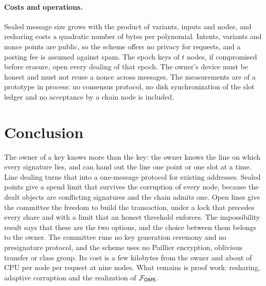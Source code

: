 \paragraph{Costs and operations.} Sealed message size grows with the product of variants, inputs and nodes, and resharing costs a quadratic number of bytes per polynomial. Intents, variants and nonce points are public, so the scheme offers no privacy for requests, and a posting fee is assumed against spam. The epoch keys of $t$ nodes, if compromised before erasure, open every dealing of that epoch. The owner's device must be honest and must not reuse a nonce across messages. The measurements are of a prototype in process: no consensus protocol, no disk synchronization of the slot ledger and no acceptance by a chain node is included.

\section{Conclusion}\label{sec:conclusion}

The owner of a key knows more than the key: the owner knows the line on which every signature lies, and can hand out the line one point or one slot at a time. Line dealing turns that into a one-message protocol for existing addresses. Sealed points give a spend limit that survives the corruption of every node, because the dealt objects are conflicting signatures and the chain admits one. Open lines give the committee the freedom to build the transaction, under a lock that precedes every share and with a limit that an honest threshold enforces. The impossibility result says that these are the two options, and the choice between them belongs to the owner. The committee runs no key generation ceremony and no presignature protocol, and the scheme uses no Paillier encryption, oblivious transfer or class group. Its cost is a few kilobytes from the owner and about \nineNodeMicrosLow{}\us{} of CPU per node per request at nine nodes. What remains is proof work: resharing, adaptive corruption and the realization of $\mathcal{F}_{\mathsf{OMS}}$.
